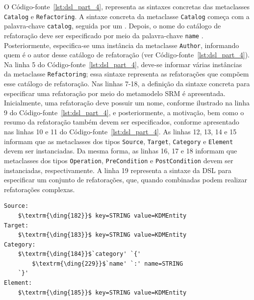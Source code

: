 O Código-fonte~\ref{lst:dsl_part_4}, representa as sintaxes concretas das metaclasses \texttt{Catalog} e \texttt{Refacto\-ring}. A sintaxe concreta da metaclasse \texttt{Catalog} começa com a palavra-chave \texttt{catalog}, seguida por um \aspas{\{}. Depois, o nome do catálogo de refatoração deve ser especificado por meio da palavra-chave \texttt{name} . Posteriormente, especifica-se uma instância da metaclasse \texttt{Author}, informando quem é o autor desse catálogo de refatoração (ver Código-fonte~\ref{lst:dsl_part_4}). Na linha 5 do Código-fonte~\ref{lst:dsl_part_4}, deve-se informar várias instâncias da metaclasse \texttt{Refactoring}; essa sintaxe representa as refatorações que compõem esse catálogo de refatoração. Nas linhas 7-18, a definição da sintaxe concreta para especificar uma refatoração por meio do metamodelo SRM é apresentada. Inicialmente, uma refatoração deve possuir um nome, conforme ilustrado na linha 9 do Código-fonte~\ref{lst:dsl_part_4}, e posteriormente, a motivação, bem como o resumo da refatoração também devem ser especificados, conforme apresentado nas linhas 10 e 11 do Código-fonte~\ref{lst:dsl_part_4}. As linhas 12, 13, 14 e 15 informam que as metaclasses dos tipos \texttt{Source}, \texttt{Target}, \texttt{Category} e \texttt{Element} devem ser instanciadas. Da mesma forma, as linhas 16, 17 e 18 informam que metaclasses dos tipos \texttt{Operation}, \texttt{PreCondition} e \texttt{PostCondition} devem ser instanciadas, respectivamente. A linha 19 representa a sintaxe da DSL para especificar um conjunto de refatorações, que, quando combinadas podem realizar refatorações complexas.


\begin{lstlisting}[language=Xtext, frame=single, basicstyle=\scriptsize, mathescape=true, label={lst:dsl_part_5_1}, caption={Gramática da DSL - parte 5}]
Source: 
	$\textrm{\ding{182}}$ key=STRING value=KDMEntity
Target: 
	$\textrm{\ding{183}}$ key=STRING value=KDMEntity
Category: 
	$\textrm{\ding{184}}$`category' `{'
		$\textrm{\ding{229}}$`name' `:' name=STRING
	`}'
Element: 
	$\textrm{\ding{185}}$ key=STRING value=KDMEntity
\end{lstlisting}



